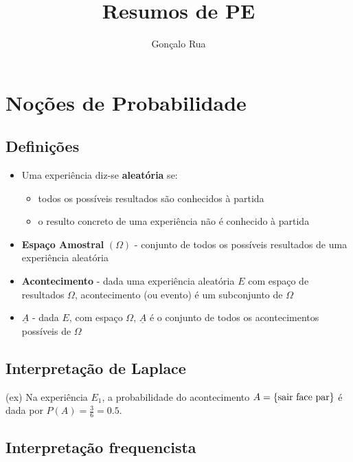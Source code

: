 \documentclass{article}
\title{Resumos de PE}
\author{Gonçalo Rua}
\begin{document}
\maketitle

\section{Noções de Probabilidade}

\subsection*{Definições}

\begin{itemize}

    \item Uma experiência diz-se \textbf{aleatória} se:

          \begin{itemize}
              \item todos os possíveis resultados são conhecidos à partida
              \item o resulto concreto de uma experiência não é conhecido à partida
          \end{itemize}

    \item \textbf{Espaço Amostral} $(\Omega)$ - conjunto de todos os possíveis resultados de uma experiência aleatória

    \item \textbf{Acontecimento} - dada uma experiência aleatória $E$ com espaço de resultados $\Omega$, acontecimento (ou evento) é um subconjunto de $\Omega$

    \item \textbf{$\underline{A}$} - dada $E$, com espaço $\Omega$, $\underline{A}$ é o conjunto de todos os acontecimentos possíveis de $\Omega$

\end{itemize}

\subsection*{Interpretação de Laplace}

(ex) Na experiência $E_1$, a probabilidade do acontecimento $A = \{\textnormal{sair face par}\}$ é dada por $P(A) = \frac{3}{6} = 0.5$.

\subsection*{Interpretação frequencista}
\end{document}
